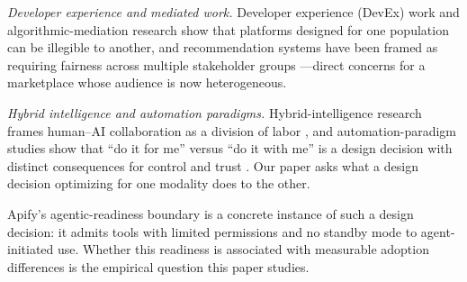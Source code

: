 \emph{Developer experience and mediated work.} Developer experience (DevEx) work
\cite{fagerholm2012developer,weisz2025codeassistant} and algorithmic-mediation
research \cite{eslami2015algorithmic,lee2015working} show that platforms
designed for one population can be illegible to another, and recommendation
systems have been framed as requiring fairness across multiple stakeholder
groups \cite{burke2017multisided}---direct concerns for a marketplace whose
audience is now heterogeneous.

\emph{Hybrid intelligence and automation paradigms.} Hybrid-intelligence
research frames human--AI collaboration as a division of labor
\cite{dellermann2019hybrid}, and automation-paradigm studies show that
``do it for me'' versus ``do it with me'' is a design decision with distinct
consequences for control and trust \cite{khurana2025doitforme}. Our paper asks
what a design decision optimizing for one modality does to the other.

Apify's agentic-readiness boundary is a concrete instance of such a design
decision: it admits tools with limited permissions and no standby mode to
agent-initiated use. Whether this readiness is associated with measurable
adoption differences is the empirical question this paper studies.
